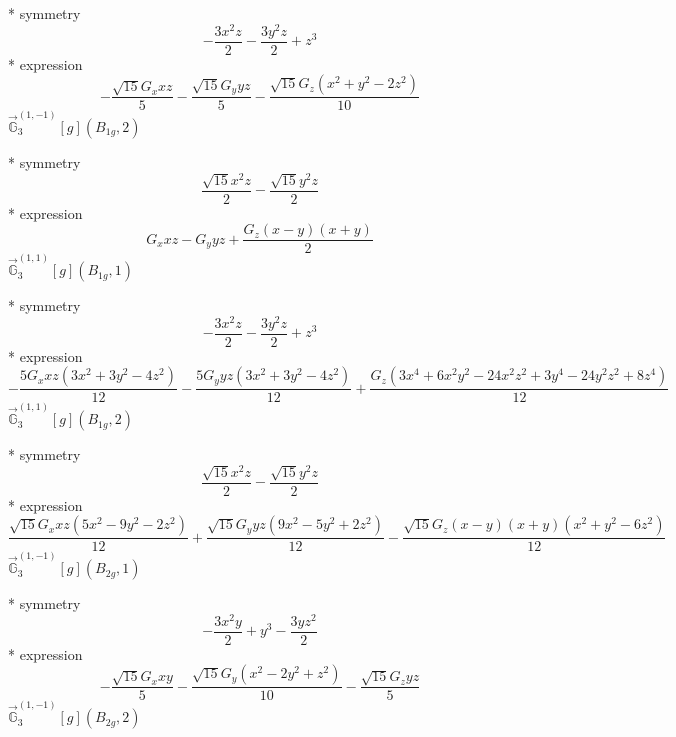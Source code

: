 \documentclass[fleqn,8pt]{jsarticle}
\begin{document}
\noindent\quad ** symmetry
\begin{dmath*}
- \frac{3 x^{2} z}{2} - \frac{3 y^{2} z}{2} + z^{3}
\end{dmath*}
\noindent\quad ** expression
\begin{dmath*}
- \frac{\sqrt{15} G_{x} x z}{5} - \frac{\sqrt{15} G_{y} y z}{5} - \frac{\sqrt{15} G_{z} \left(x^{2} + y^{2} - 2 z^{2}\right)}{10}
\end{dmath*}
\noindent\quad $\vec{\mathbb{G}}_{3}^{(1,-1)}[g](B_{1g},2)$

\noindent\quad ** symmetry
\begin{dmath*}
\frac{\sqrt{15} x^{2} z}{2} - \frac{\sqrt{15} y^{2} z}{2}
\end{dmath*}
\noindent\quad ** expression
\begin{dmath*}
G_{x} x z - G_{y} y z + \frac{G_{z} \left(x - y\right) \left(x + y\right)}{2}
\end{dmath*}
\noindent\quad $\vec{\mathbb{G}}_{3}^{(1,1)}[g](B_{1g},1)$

\noindent\quad ** symmetry
\begin{dmath*}
- \frac{3 x^{2} z}{2} - \frac{3 y^{2} z}{2} + z^{3}
\end{dmath*}
\noindent\quad ** expression
\begin{dmath*}
- \frac{5 G_{x} x z \left(3 x^{2} + 3 y^{2} - 4 z^{2}\right)}{12} - \frac{5 G_{y} y z \left(3 x^{2} + 3 y^{2} - 4 z^{2}\right)}{12} + \frac{G_{z} \left(3 x^{4} + 6 x^{2} y^{2} - 24 x^{2} z^{2} + 3 y^{4} - 24 y^{2} z^{2} + 8 z^{4}\right)}{12}
\end{dmath*}
\noindent\quad $\vec{\mathbb{G}}_{3}^{(1,1)}[g](B_{1g},2)$

\noindent\quad ** symmetry
\begin{dmath*}
\frac{\sqrt{15} x^{2} z}{2} - \frac{\sqrt{15} y^{2} z}{2}
\end{dmath*}
\noindent\quad ** expression
\begin{dmath*}
\frac{\sqrt{15} G_{x} x z \left(5 x^{2} - 9 y^{2} - 2 z^{2}\right)}{12} + \frac{\sqrt{15} G_{y} y z \left(9 x^{2} - 5 y^{2} + 2 z^{2}\right)}{12} - \frac{\sqrt{15} G_{z} \left(x - y\right) \left(x + y\right) \left(x^{2} + y^{2} - 6 z^{2}\right)}{12}
\end{dmath*}
\noindent\quad $\vec{\mathbb{G}}_{3}^{(1,-1)}[g](B_{2g},1)$

\noindent\quad ** symmetry
\begin{dmath*}
- \frac{3 x^{2} y}{2} + y^{3} - \frac{3 y z^{2}}{2}
\end{dmath*}
\noindent\quad ** expression
\begin{dmath*}
- \frac{\sqrt{15} G_{x} x y}{5} - \frac{\sqrt{15} G_{y} \left(x^{2} - 2 y^{2} + z^{2}\right)}{10} - \frac{\sqrt{15} G_{z} y z}{5}
\end{dmath*}
\noindent\quad $\vec{\mathbb{G}}_{3}^{(1,-1)}[g](B_{2g},2)$
\end{document}
